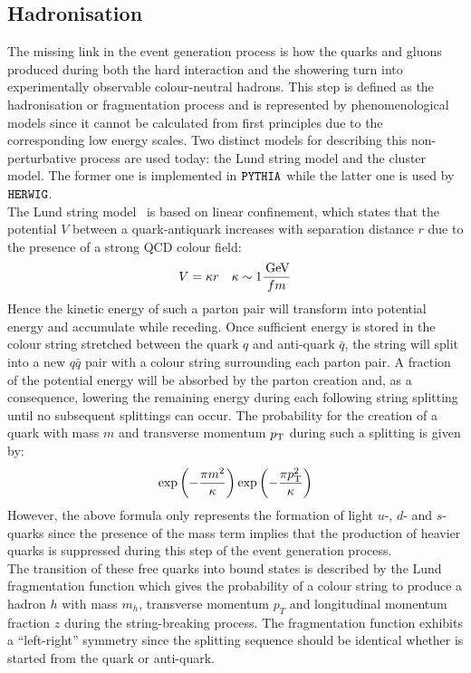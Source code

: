 \subsection{Hadronisation} \label{sec::Hadronisation}
The missing link in the event generation process is how the quarks and gluons produced during both the hard interaction and the showering turn into experimentally observable colour-neutral hadrons. This step is defined as the hadronisation or fragmentation process and is represented by phenomenological models since it cannot be calculated from first principles due to the corresponding low energy scales.
Two distinct models for describing this non-perturbative process are used today: the Lund string model and the cluster model. The former one is implemented in $\texttt{PYTHIA}$ while the latter one is used by $\texttt{HERWIG}$.
\\
The Lund string model~\cite{Lund} is based on linear confinement, which states that the potential $V$ between a quark-antiquark increases with separation distance $r$ due to the presence of a strong QCD colour field: %
\begin{equation}\label{eq::VQCD}
 V = \kappa r ~~~ \kappa \sim 1 \dfrac{\, \mathrm{GeV}}{fm}
\end{equation}
Hence the kinetic energy of such a parton pair will transform into potential energy and accumulate while receding. 
Once sufficient energy is stored in the colour string stretched between the quark $q$ and anti-quark $\bar{q}$, the string will split into a new $q\bar{q}$ pair with a colour string surrounding each parton pair.
A fraction of the potential energy will be absorbed by the parton creation and, as a consequence, lowering the remaining energy during each following string splitting until no subsequent splittings can occur.
The probability for the creation of a quark with mass $m$ and transverse momentum $p_{\rm T}$ during such a splitting is given by:
\begin{equation}\label{eq::mBot}
 \exp \left( -\frac{\pi m^{2}}{\kappa} \right) \exp \left(-\frac{\pi p_{\rm T}^{2}}{\kappa} \right)
\end{equation}
However, the above formula only represents the formation of light $u$-, $d$- and $s$-quarks since the presence of the mass term implies that the production of heavier quarks is suppressed during this step of the event generation process. 
\\
The transition of these free quarks into bound states is described by the Lund fragmentation function which gives the probability of a colour string to produce a hadron $h$ with mass $m_{h}$, transverse momentum $p_{T}$ and longitudinal momentum fraction $z$ during the string-breaking process. The fragmentation function exhibits a ``left-right'' symmetry since the splitting sequence should be identical whether is started from the quark or anti-quark.
